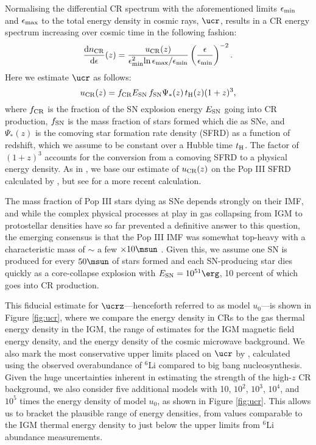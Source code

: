 Normalising the differential CR spectrum with the aforementioned limits $\epsilon_{\rm min}$ and $\epsilon_{\rm max}$ to the total energy density in cosmic rays, $\ucr$, results in a CR energy spectrum increasing over cosmic time in the following fashion:
 \begin{equation}
 \frac{{\rm d}n_{\rm \small CR}}{{\rm d}\epsilon}(z) = \frac{u_{\rm \small CR}(z)}{\epsilon_{\rm min}^2{\rm ln}\,\epsilon_{\rm max}{\large /}\epsilon_{\rm min}}  \left( \frac{\epsilon}{\epsilon_{\rm min}} \right)^{-2}.
 \end{equation}
Here we estimate $\ucr$ as follows:
\begin{equation}
u_{\rm \small CR}(z) = f_{\rm \small CR} E_{\rm \small SN}\, f_{\rm \small SN} \Psi_{*}(z)\, t_{\rm \small H}(z) (1+z)^3,
\end{equation}
where $f_{\rm \small CR}$ is the fraction of the SN explosion energy $E_{\rm \small SN}$ going into CR production, $f_{\rm \small SN}$ is the mass fraction of stars formed which die as SNe, and $\Psi_{*}(z)$ is the comoving star formation rate density (SFRD) as a function of redshift, which we assume to be constant over a Hubble time $t_{\rm \small H}$. 
The factor of $(1+z)^3$ accounts for the conversion from a comoving SFRD to a physical energy density. As in \citet{Hummeletal2015}, we base our estimate of $u_{\rm \small CR}(z)$ on the Pop III SFRD calculated by \citet{GreifBromm2006}, but see \citet{Campisietal2011} for a more recent calculation. 

The mass fraction of Pop III stars dying as SNe depends strongly on their IMF, and while the complex physical processes at play in gas collapsing from IGM to protostellar densities have so far prevented a definitive answer to this question, the emerging consensus is that the Pop III IMF was somewhat top-heavy with a characteristic mass of $\sim$ a few $\times 10\msun$ \citep{Bromm2013}.  
Given this, we assume one SN is produced for every $50\msun$ of stars formed and each SN-producing star dies quickly as a core-collapse explosion with $E_{\rm \small SN} = 10^{51}\erg$, 10 percent of which goes into CR production.  

This fiducial estimate for $\ucrz$---henceforth referred to as model $u_0$---is shown in Figure \ref{fig:ucr}, where we compare the energy density in CRs to the gas thermal energy density in the IGM, the range of estimates for the IGM magnetic field energy density, and the energy density of the cosmic microwave background. 
We also mark the most conservative upper limits placed on $\ucr$ by \citet{RollindeVangioniOlive2006}, calculated using the observed overabundance of $^6$Li compared to big bang nucleosynthesis. 
Given the huge uncertainties inherent in estimating the strength of the high-$z$ CR background, we also consider five additional models with 10, $10^2$, $10^3$, $10^4$, and $10^5$ times the energy density of model $u_0$, as shown in Figure \ref{fig:ucr}.  
This allows us to bracket the plausible range of energy densities, from values comparable to the IGM thermal energy density to just below the upper limits from $^6$Li abundance measurements.
 